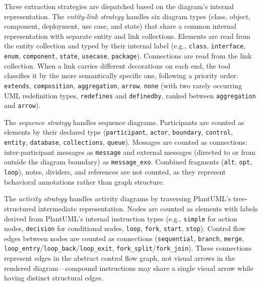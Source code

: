 \documentclass[data,datadescriptor,submit,pdftex,moreauthors]{Definitions/mdpi}
\begin{document}
Three extraction strategies are dispatched based on the diagram's internal representation. The \emph{entity-link strategy} handles six diagram types (class, object, component, deployment, use case, and state) that share a common internal representation with separate entity and link collections. Elements are read from the entity collection and typed by their internal label (e.g., \texttt{class}, \texttt{interface}, \texttt{enum}, \texttt{component}, \texttt{state}, \texttt{usecase}, \texttt{package}). Connections are read from the link collection. When a link carries different decorations on each end, the tool classifies it by the more semantically specific one, following a priority order: \texttt{extends}, \texttt{composition}, \texttt{aggregation}, \texttt{arrow}, \texttt{none} (with two rarely occurring UML redefinition types, \texttt{redefines} and \texttt{definedby}, ranked between \texttt{aggregation} and \texttt{arrow}).

The \emph{sequence strategy} handles sequence diagrams. Participants are counted as elements by their declared type (\texttt{participant}, \texttt{actor}, \texttt{boundary}, \texttt{control}, \texttt{entity}, \texttt{database}, \texttt{collections}, \texttt{queue}). Messages are counted as connections: inter-participant messages as \texttt{message} and external messages (directed to or from outside the diagram boundary) as \texttt{message\_exo}. Combined fragments (\texttt{alt}, \texttt{opt}, \texttt{loop}), notes, dividers, and references are not counted, as they represent behavioral annotations rather than graph structure.

The \emph{activity strategy} handles activity diagrams by traversing PlantUML's tree-structured intermediate representation. Nodes are counted as elements with labels derived from PlantUML's internal instruction types (e.g., \texttt{simple} for action nodes, \texttt{decision} for conditional nodes, \texttt{loop}, \texttt{fork}, \texttt{start}, \texttt{stop}). Control flow edges between nodes are counted as connections (\texttt{sequential}, \texttt{branch}, \texttt{merge}, \texttt{loop\_entry}/\texttt{loop\_back}/\texttt{loop\_exit}, \texttt{fork\_split}/\texttt{fork\_join}). These connections represent edges in the abstract control flow graph, not visual arrows in the rendered diagram---compound instructions may share a single visual arrow while having distinct structural edges.
\end{document}
